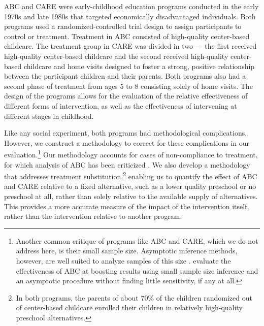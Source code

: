 ABC and CARE were early-childhood education programs conducted in the early 1970s and late 1980s that targeted economically disadvantaged individuals. Both programs used a randomized-controlled trial design to assign participants to control or treatment. Treatment in ABC consisted of high-quality center-based childcare. The treatment group in CARE was divided in two –-- the first received high-quality center-based childcare and the second received high-quality center-based childcare and home visits designed to foster a strong, positive relationship between the participant children and their parents. Both programs also had a second phase of treatment from ages 5 to 8 consisting solely of home visits. The design of the programs allows for the evaluation of the relative effectiveness of different forms of intervention, as well as the effectiveness of intervening at different stages in childhood.  

Like any social experiment, both programs had methodological complications. However, we construct a methodology to correct for these complications in our evaluation.\footnote{Another common critique of programs like ABC and CARE, which we do not address here, is their small sample size. Asymptotic inference methods, however, are well suited to analyze samples of this size \citep{Hanushek_Lindseth_2009_BOOKSchoolhousesCourthouses}. \citet{Campbell_Conti_etal_2014_EarlyChildhoodInvestments} evaluate the effectiveness of ABC at boosting results using small sample size inference and an asymptotic procedure without finding little sensitivity, if any at all.} Our methodology accounts for cases of non-compliance to treatment, for which analysis of ABC has been criticized \citep{Hu_2014_ABC-Study}.
We also develop a methodology that addresses treatment substitution,\footnote{In both programs, the parents of about 70\% of the children randomized out of center-based childcare enrolled their children in relatively high-quality preschool alternatives.} enabling us to quantify the effect of ABC and CARE relative to a fixed alternative, such as a lower quality preschool or no preschool at all, rather than solely relative to the available supply of alternatives. This provides a more accurate measure of the impact of the intervention itself, rather than the intervention relative to another program.

